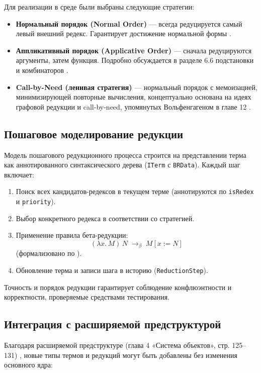 Для реализации в среде были выбраны следующие стратегии:

\begin{itemize}
  \item \textbf{Нормальный порядок (Normal Order)} — всегда редуцируется самый левый внешний редекс. Гарантирует достижение нормальной формы \cite[§5.2.4, §5.4.2]{Wolfengagen2004}.
  \item \textbf{Аппликативный порядок (Applicative Order)} — сначала редуцируются аргументы, затем функция. Подробно обсуждается в разделе 6.6 подстановки и комбинаторов \cite[§6.6]{Wolfengagen2004}.
  \item \textbf{Call-by-Need (ленивая стратегия)} — нормальный порядок с мемоизацией, минимизирующей повторные вычисления, концептуально основана на идеях графовой редукции и call-by-need, упомянутых Вольфенгагеном в главе 12 \cite{Wolfengagen2004}.
\end{itemize}

\subsection{Пошаговое моделирование редукции}

Модель пошагового редукционного процесса строится на представлении терма как аннотированного синтаксического дерева (\verb|ITerm| с \verb|BRData|). Каждый шаг включает:

\begin{enumerate}
  \item Поиск всех кандидатов-редексов в текущем терме (аннотируются по \texttt{isRedex} и \texttt{priority}).
  \item Выбор конкретного редекса в соответствии со стратегией.
  \item Применение правила бета-редукции:
    \[
      (\lambda x.\,M)\,N \;\to_\beta\; M[x:=N]
    \]
    (формализовано по \cite{Wolfengagen2004}).
  \item Обновление терма и записи шага в историю (\verb|ReductionStep|).
\end{enumerate}

Точность и порядок редукции гарантирует соблюдение конфлюэнтности и корректности, проверяемые средствами тестирования.

\subsection{Интеграция с расширяемой предструктурой}

Благодаря расширяемой предструктуре (глава 4 «Система объектов», стр. 125–131) \cite{Wolfengagen2004}, новые типы термов и редукций могут быть добавлены без изменения основного ядра:

